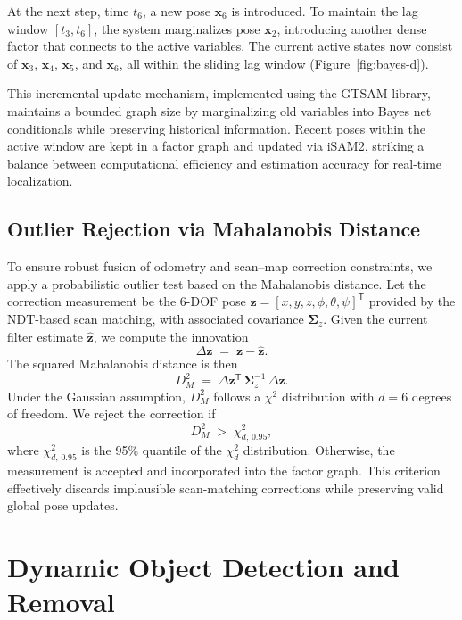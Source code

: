 At the next step, time \( t_6 \), a new pose \( \mathbf{x}_6 \) is introduced. To maintain the lag window \( [t_3, t_6] \), the system marginalizes pose \( \mathbf{x}_2 \), introducing another dense factor that connects to the active variables. The current active states now consist of \( \mathbf{x}_3 \), \( \mathbf{x}_4 \), \( \mathbf{x}_5 \), and \( \mathbf{x}_6 \), all within the sliding lag window (Figure~\ref{fig:bayes-d}).

This incremental update mechanism, implemented using the GTSAM library, maintains a bounded graph size by marginalizing old variables into Bayes net conditionals while preserving historical information. Recent poses within the active window are kept in a factor graph and updated via iSAM2, striking a balance between computational efficiency and estimation accuracy for real-time localization.

\subsection{Outlier Rejection via Mahalanobis Distance}

To ensure robust fusion of odometry and scan–map correction constraints, we apply a probabilistic outlier test based on the Mahalanobis distance. Let the correction measurement be the 6-DOF pose  
\(\mathbf{z} = [x, y, z, \phi, \theta, \psi]^\mathsf{T}\)  
provided by the NDT-based scan matching, with associated covariance \(\mathbf{\Sigma}_z\). Given the current filter estimate \(\hat{\mathbf{z}}\), we compute the innovation  
\[
\Delta \mathbf{z} \;=\; \mathbf{z} - \hat{\mathbf{z}}.
\]  
The squared Mahalanobis distance is then
\begin{equation}
	\label{eq:mahalanobis}
	D_M^2 \;=\;\Delta \mathbf{z}^\mathsf{T}\,\mathbf{\Sigma}_z^{-1}\,\Delta \mathbf{z}.
\end{equation}
Under the Gaussian assumption, \(D_M^2\) follows a \(\chi^2\) distribution with \(d=6\) degrees of freedom. We reject the correction if
\begin{equation}
	\label{eq:threshold}
	D_M^2 \;>\;\chi^2_{d,\,0.95},
\end{equation}
where \(\chi^2_{d,\,0.95}\) is the 95\% quantile of the \(\chi^2_d\) distribution. Otherwise, the measurement is accepted and incorporated into the factor graph. This criterion effectively discards implausible scan-matching corrections while preserving valid global pose updates.


\section{Dynamic Object Detection and Removal}

